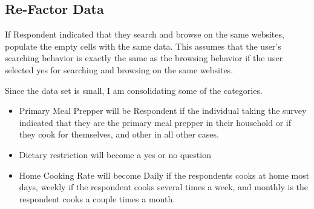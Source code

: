 \documentclass[
]{article}
\newenvironment{Shaded}{\begin{snugshade}}{\end{snugshade}}
\newcommand{\ControlFlowTok}[1]{\textcolor[rgb]{0.13,0.29,0.53}{\textbf{#1}}}
\newcommand{\DecValTok}[1]{\textcolor[rgb]{0.00,0.00,0.81}{#1}}
\newcommand{\KeywordTok}[1]{\textcolor[rgb]{0.13,0.29,0.53}{\textbf{#1}}}
\newcommand{\NormalTok}[1]{#1}
\newcommand{\OperatorTok}[1]{\textcolor[rgb]{0.81,0.36,0.00}{\textbf{#1}}}
\newcommand{\StringTok}[1]{\textcolor[rgb]{0.31,0.60,0.02}{#1}}
\begin{document}
\hypertarget{re-factor-data}{%
\subsection{Re-Factor Data}\label{re-factor-data}}

If Respondent indicated that they search and browse on the same
websites, populate the empty cells with the same data. This assumes that
the user's searching behavior is exactly the same as the browsing
behavior if the user selected yes for searching and browsing on the same
websites.

\begin{Shaded}
\end{Shaded}

Since the data set is small, I am consolidating some of the categories.

\begin{itemize}
\item
  Primary Meal Prepper will be Respondent if the individual taking the
  survey indicated that they are the primary meal prepper in their
  household or if they cook for themselves, and other in all other
  cases.
\item
  Dietary restriction will become a yes or no question
\item
  Home Cooking Rate will become Daily if the respondents cooks at home
  most days, weekly if the respondent cooks several times a week, and
  monthly is the respondent cooks a couple times a month.
\end{itemize}
\end{document}
